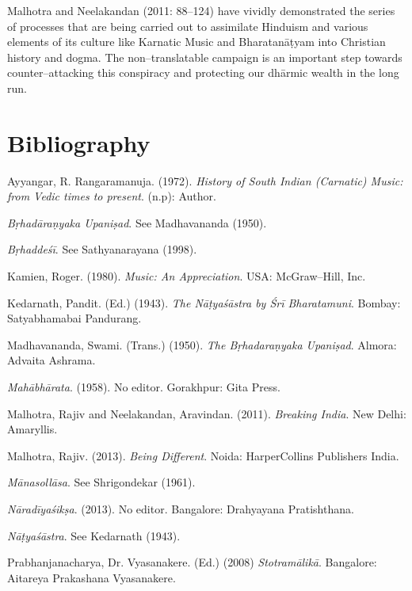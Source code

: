 Malhotra and Neelakandan (2011: 88–124) have vividly demonstrated the series of processes that are being carried out to assimilate Hinduism and various elements of its culture like Karnatic Music and Bharatanāṭyam into Christian history and dogma. The non–translatable campaign is an important step towards counter–attacking this conspiracy and protecting our dhārmic wealth in the long run.


\section*{Bibliography}

\begin{thebibliography}{99}
 Ayyangar, R. Rangaramanuja. (1972). \textit{History of South Indian (Carnatic) Music: from Vedic times to present}. (n.p): Author.

  \textit{Bṛhadāraṇyaka Upaniṣad}. See Madhavananda (1950).

  \textit{Bṛhaddeśī}. See Sathyanarayana (1998).

  Kamien, Roger. (1980). \textit{Music: An Appreciation}. USA: McGraw–Hill, Inc.

  Kedarnath, Pandit. (Ed.) (1943). \textit{The Nāṭyaśāstra by Śrī Bharatamuni}. Bombay: Satyabhamabai Pandurang.

  Madhavananda, Swami. (Trans.) (1950). \textit{The Bṛhadaraṇyaka Upaniṣad}. Almora: Advaita Ashrama.

  \textit{Mahābhārata}. (1958). No editor. Gorakhpur: Gita Press.

  Malhotra, Rajiv and Neelakandan, Aravindan. (2011). \textit{Breaking India}. New Delhi: Amaryllis.

  Malhotra, Rajiv. (2013). \textit{Being Different}. Noida: HarperCollins Publishers India.

  \textit{Mānasollāsa}. See Shrigondekar (1961).

  \textit{Nāradīyaśikṣa}. (2013). No editor. Bangalore: Drahyayana Pratishthana.

  \textit{Nāṭyaśāstra}. See Kedarnath (1943).

  Prabhanjanacharya, Dr. Vyasanakere. (Ed.) (2008) \textit{Stotramālikā}. Bangalore: Aitareya Prakashana Vyasanakere.


\end{thebibliography}
